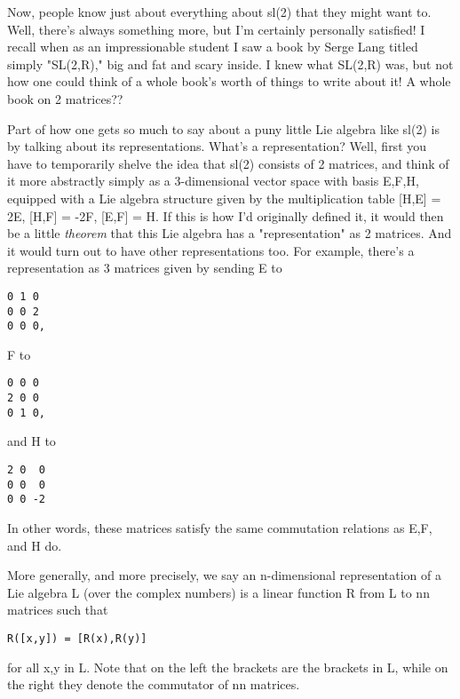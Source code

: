 Now, people know just about everything about sl(2) that they might want
to.  Well, there's always something more, but I'm certainly personally
satisfied!  I recall when as an impressionable student I saw a book by
Serge Lang titled simply "SL(2,R)," big and fat and scary inside.  I
knew what SL(2,R) was, but not how one could think of a whole book's
worth of things to write about it!  A whole book on 2 matrices??  

Part of how one gets so much to say about a puny little Lie algebra
like sl(2) is by talking about its representations.  What's a
representation?  Well, first you have to temporarily shelve the idea
that sl(2) consists of 2 matrices, and think of it more
abstractly simply as a 3-dimensional vector space with basis E,F,H,
equipped with a Lie algebra structure given by the multiplication
table [H,E] = 2E, [H,F] = -2F, [E,F] = H.  If this is how I'd
originally defined it, it would then be a little \emph{theorem} that
this Lie algebra has a "representation" as 2 matrices.  And it
would turn out to have other representations too.  For example,
there's a representation as 3 matrices given by sending E to

\begin{verbatim}
0 1 0
0 0 2
0 0 0, 
\end{verbatim}
    

F to 

\begin{verbatim}
0 0 0 
2 0 0 
0 1 0, 
\end{verbatim}
    

and H to 

\begin{verbatim}
2 0  0 
0 0  0 
0 0 -2
\end{verbatim}
    

In other words, these matrices satisfy the same commutation relations as
E,F, and H do.  

More generally, and more precisely, we say an n-dimensional
representation of a Lie algebra L (over the complex numbers) is a linear
function R from L to n\times n matrices such that

\begin{verbatim}
R([x,y]) = [R(x),R(y)]
\end{verbatim}
    

for all x,y in L.  Note that on the left the brackets are the brackets
in L, while on the right they denote the commutator of n\times n matrices.  

